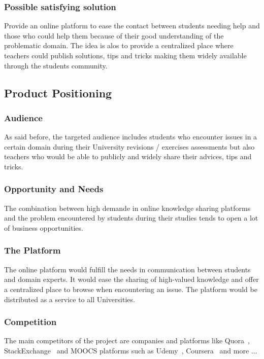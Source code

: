 \documentclass[12pt,a4paper,oneside, titlepage]{article}
\begin{document}
         \subsubsection{Possible satisfying solution}
         Provide an online platform to ease the contact between students needing help and those who could help 
         them because of their good understanding of the problematic domain. The idea is alos to provide a 
         centralized place where teachers could publish solutions, tips and tricks making them widely available 
         through the students community.
         
         
		\subsection{Product Positioning}
		
		\subsubsection{Audience}
		As said before, the targeted audience includes students who encounter issues in a certain domain during 
		their University revisions / exercises assessments but also teachers who would be able to publicly and 
		widely share their advices, tips and tricks.
		
	    \subsubsection{Opportunity and Needs}
		The combination between high demande in online knowledge sharing platforms and the problem encountered 
		by students during their studies tends to open a lot of business opportunities.
		
	    \subsubsection{The Platform}
		The online platform would fulfill the needs in communication between students and domain experts. It 
		would ease the sharing of high-valued knowledge and offer a centralized place to browse when 
		encountering an issue. The platform would be distributed as a service to all Universities.
		
	    \subsubsection{Competition}
		The main competitors of the project are companies and platforms like Quora~\cite{quoraWebsite}, 
		StackExchange~\cite{stackExchangeWebsite} and MOOCS platforms such as Udemy~\cite{udemyWebsite}, 
		Coursera~\cite{courseraWebsite} and more ... \newline
		
\end{document}
